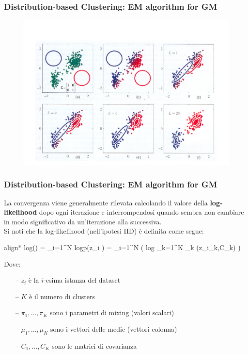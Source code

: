 \begin{frame}

	\frametitle{{\color{GradientDescentDiagramOrange}Distribution-based Clustering}: EM algorithm for GM}

		\begin{figure}[!htbp]
			\centering
			\includegraphics[width=0.9\linewidth]{images/unsupervised/gaussian_mixture/gmm_1.pdf}
		\end{figure}

\end{frame}


\begin{frame}

	\frametitle{{\color{GradientDescentDiagramOrange}Distribution-based Clustering}: EM algorithm for GM}

		La convergenza viene generalmente rilevata calcolando il valore della \textbf{log-likelihood} dopo ogni iterazione e interrompendosi quando sembra non cambiare in modo significativo da un'iterazione alla successiva.\\
		Si noti che la log-likelihood (nell'ipotesi IID) è definita come segue:
		\begin{empheq}[box=\fcolorbox{blue!40!black!60}{yellow!10}]{align*}
			log\text{ }\ell (\Theta) = \sum_{i=1}^{N} log\text{ }p(z_i \vert \Theta) = \sum_{i=1}^{N} \left( log \sum_{k=1}^{K} \pi_k (z_i\vert\mu_k,C_k) \right)
		\end{empheq}

		Dove:
		\begin{itemize}
			\item[--] $z_i$ è la $i$-esima istanza del dataset
			\item[--] $K$ è il numero di clusters
			\item[--] $\pi_1,...,\pi_K$ sono i parametri di mixing (valori scalari)
			\item[--] $\mu_1,...,\mu_K$ sono i vettori delle medie (vettori colonna)
			\item[--] $C_1,...,C_K$ sono le matrici di covarianza 
		\end{itemize}
		
\end{frame}


